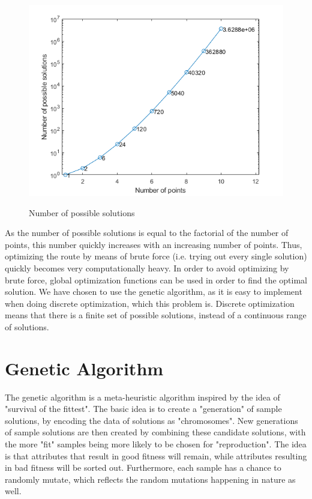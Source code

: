 \begin{figure}[H]
	\centering
	{\includegraphics[scale=0.5]{Images/number_of_possible_solutions.PNG}}\\[0.5cm]
	\caption{Number of possible solutions}
	\label{fig:number_of_possible_solutions}
\end{figure}


As the number of possible solutions is equal to the factorial of the number of points, this number quickly increases with an increasing number of points. Thus, optimizing the route by means of brute force (i.e. trying out every single solution) quickly becomes very computationally heavy. In order to avoid optimizing by brute force, global optimization functions can be used in order to find the optimal solution. We have chosen to use the genetic algorithm, as it is easy to implement when doing discrete optimization, which this problem is. Discrete optimization means that there is a finite set of possible solutions, instead of a continuous range of solutions.

\section{Genetic Algorithm}
The genetic algorithm is a meta-heuristic algorithm inspired by the idea of "survival of the fittest". The basic idea is to create a "generation" of sample solutions, by encoding the data of solutions as "chromosomes". New generations of sample solutions are then created by combining these candidate solutions, with the more "fit" samples being more likely to be chosen for "reproduction". The idea is that attributes that result in good fitness will remain, while attributes resulting in bad fitness will be sorted out. Furthermore, each sample has a chance to randomly mutate, which reflects the random mutations happening in nature as well.

